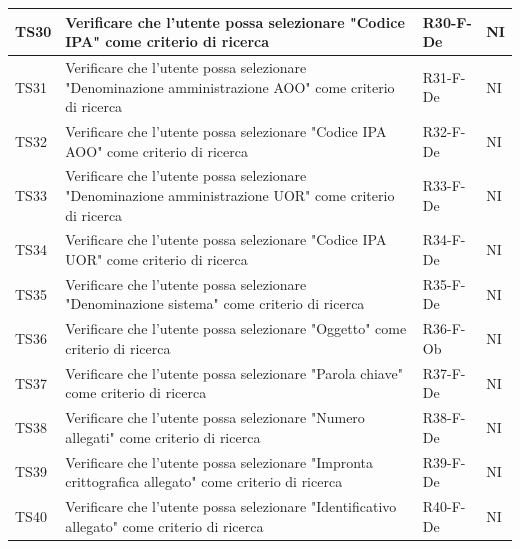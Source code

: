 \documentclass[a4paper,12pt]{article}
\begin{document}
\begin{longtable}{|M{1.2cm}|M{6.3cm}|M{2.5cm}|M{1.5cm}|}
                TS30 & Verificare che l'utente possa selezionare "Codice IPA" come criterio di ricerca & R30-F-De & NI \\
                \hline

                TS31 & Verificare che l'utente possa selezionare "Denominazione amministrazione AOO" come criterio di ricerca & R31-F-De & NI \\
                \hline

                TS32 & Verificare che l'utente possa selezionare "Codice IPA AOO" come criterio di ricerca & R32-F-De & NI \\
                \hline

                TS33 & Verificare che l'utente possa selezionare "Denominazione amministrazione UOR" come criterio di ricerca & R33-F-De & NI \\
                \hline

                TS34 & Verificare che l'utente possa selezionare "Codice IPA UOR" come criterio di ricerca & R34-F-De & NI \\
                \hline
                
                TS35 & Verificare che l'utente possa selezionare "Denominazione sistema" come criterio di ricerca & R35-F-De & NI \\
                \hline
                
                TS36 & Verificare che l'utente possa selezionare "Oggetto" come criterio di ricerca & R36-F-Ob & NI \\
                \hline
                
                TS37 & Verificare che l'utente possa selezionare "Parola chiave" come criterio di ricerca & R37-F-De & NI \\
                \hline
                
                TS38 & Verificare che l'utente possa selezionare "Numero allegati" come criterio di ricerca & R38-F-De & NI \\
                \hline
                
                TS39 & Verificare che l'utente possa selezionare "Impronta crittografica allegato" come criterio di ricerca & R39-F-De & NI \\
                \hline
                
                TS40 & Verificare che l'utente possa selezionare "Identificativo allegato" come criterio di ricerca & R40-F-De & NI \\
                \hline
                

\end{longtable}
\end{document}
